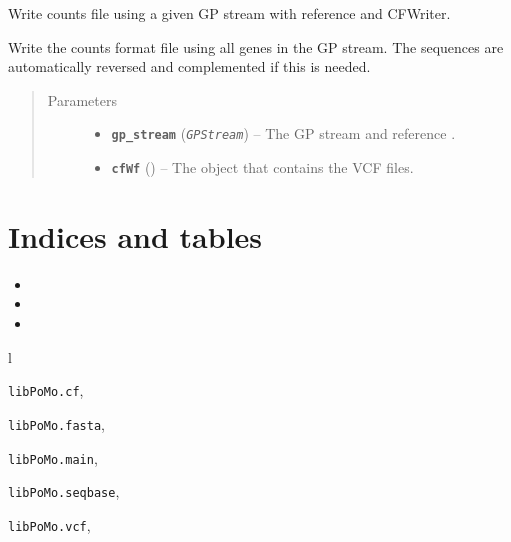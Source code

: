 \documentclass[letterpaper,10pt,english]{sphinxmanual}
\begin{document}

\begin{fulllineitems}
\label{cf:libPoMo.cf.write_cf_from_gp_stream}
Write counts file using a given GP stream with reference and CFWriter.

Write the counts format file using all genes in the GP stream.
The sequences are automatically reversed and complemented if this
is needed.
\begin{quote}\begin{description}
\item[{Parameters}] \leavevmode\begin{itemize}
\item {} 
\textbf{\texttt{gp\_stream}} (\emph{\texttt{GPStream}}) -- The GP stream and reference .

\item {} 
\textbf{\texttt{cfWf}} ({\hyperref[cf:libPoMo.cf.CFWriter]{}}) -- The {\hyperref[cf:libPoMo.cf.CFWriter]{}} object that contains
the VCF files.

\end{itemize}

\end{description}\end{quote}

\end{fulllineitems}



\chapter{Indices and tables}
\label{index:indices-and-tables}\begin{itemize}
\item {} 

\item {} 

\item {} 

\end{itemize}


\renewcommand{\indexname}{Python Module Index}
\begin{theindex}
\def\bigletter#1{{\Large\sffamily#1}\nopagebreak\vspace{1mm}}
\bigletter{l}
\item {\texttt{libPoMo.cf}}, \pageref{cf:module-libPoMo.cf}
\item {\texttt{libPoMo.fasta}}, \pageref{fasta:module-libPoMo.fasta}
\item {\texttt{libPoMo.main}}, \pageref{main:module-libPoMo.main}
\item {\texttt{libPoMo.seqbase}}, \pageref{seqbase:module-libPoMo.seqbase}
\item {\texttt{libPoMo.vcf}}, \pageref{vcf:module-libPoMo.vcf}
\end{theindex}

\renewcommand{\indexname}{Index}
\printindex
\end{document}
